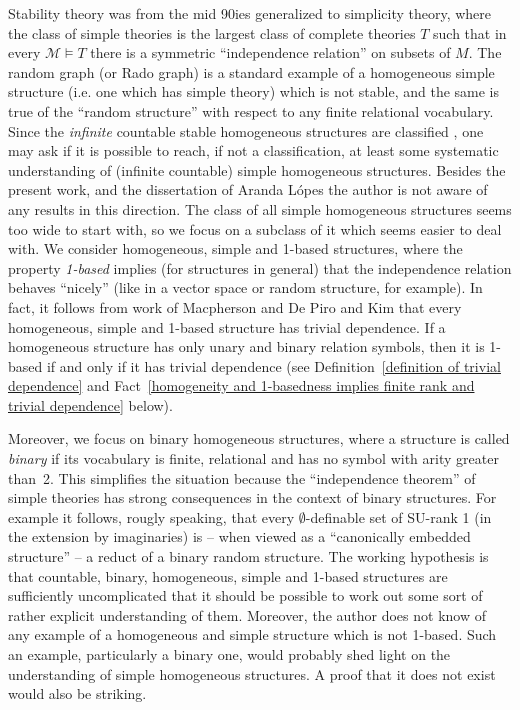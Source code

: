 \documentclass[11pt, twoside]{amsart}
\numberwithin{equation}{section}
\newcommand{\es}{\emptyset}
\newcommand{\mcM}{\mathcal{M}}
\begin{document}
Stability theory was from the mid 90ies generalized to simplicity theory, where the class of simple theories is the largest class of
complete theories $T$ such that in every $\mcM \models T$ there is a symmetric ``independence relation'' on subsets of $M$.
The random graph (or Rado graph) is a standard example of a homogeneous simple structure (i.e. one which has simple theory)
which is not stable, and the same is true of
the ``random structure'' with respect to any finite relational vocabulary.
Since the {\em infinite} countable stable homogeneous structures are classified \cite{Lach97}, 
one may ask if it is possible to reach, if not a classification, at least
some systematic understanding of (infinite countable) simple homogeneous structures.
Besides the present work, \cite{AK14, Kop15} and the dissertation of Aranda L\'{o}pes \cite{AL} 
the author is not aware of any results in this direction.
The class of all simple homogeneous structures seems too wide to start with, 
so we focus on a subclass of it which seems easier to deal with.
We consider homogeneous, simple and 1-based structures, where the property {\em 1-based} implies 
(for structures in general) that the 
independence relation behaves ``nicely''
(like in a vector space or random structure, for example). 
In fact, it follows from work of Macpherson \cite{Mac91} and De Piro and Kim \cite{PK} that 
every homogeneous, simple and 1-based structure has trivial dependence.
If a homogeneous structure has only unary and binary relation symbols,
then it is 1-based if and only if it has trivial dependence
(see Definition~\ref{definition of trivial dependence} and 
Fact~\ref{homogeneity and 1-basedness implies finite rank and trivial dependence} below).

Moreover, we focus on binary homogeneous structures, where a structure is called {\em binary} if its vocabulary is finite, relational
and has no symbol with arity greater than~2. 
This simplifies the situation because the ``independence theorem'' of simple theories has strong consequences in the context
of binary structures. For example it follows, rougly speaking, 
that every $\es$-definable set of SU-rank 1 (in the extension by imaginaries)
is -- when viewed as a ``canonically embedded structure'' -- a reduct of a binary random structure.
The working hypothesis is that countable, binary, homogeneous, simple and 1-based structures are sufficiently uncomplicated that it should be possible to work out some sort of rather explicit understanding of them.
Moreover, the author does not know of any example of a homogeneous and simple structure which is not 1-based.
Such an example, particularly a binary one, would probably shed light on the understanding of simple homogeneous structures.
A proof that it does not exist would also be striking.
\end{document}
